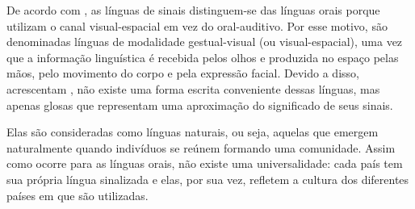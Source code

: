 



De acordo com , as línguas de sinais distinguem-se das línguas orais porque utilizam o canal visual-espacial em vez do oral-auditivo. Por esse motivo, são denominadas línguas de modalidade gestual-visual (ou visual-espacial), uma vez que a informação linguística é recebida pelos olhos e produzida no espaço pelas mãos, pelo movimento do corpo e pela expressão facial.
Devido a disso, acrescentam , não existe uma forma escrita conveniente dessas línguas, mas apenas glosas que representam uma aproximação do significado de seus sinais.

Elas são consideradas como línguas naturais, ou seja, aquelas que emergem naturalmente quando indivíduos se reúnem formando uma comunidade. Assim como ocorre para as línguas orais, não existe uma universalidade: cada país tem sua própria língua sinalizada e elas, por sua vez, refletem a cultura dos diferentes países em que são utilizadas.




